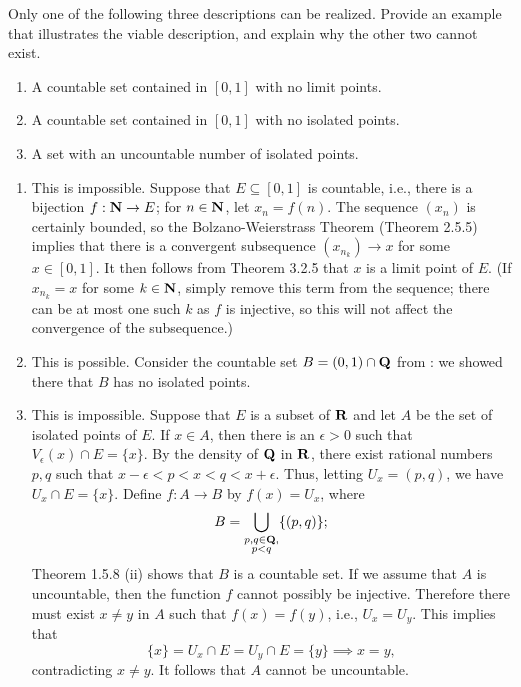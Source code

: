 \documentclass{lew98_solutions}
\begin{document}
\begin{exercise}
\label{ex:3.2.10}
    Only one of the following three descriptions can be realized. Provide an example that illustrates the viable description, and explain why the other two cannot exist.
    \begin{enumerate}
        \item A countable set contained in \( [0, 1] \) with no limit points.

        \item A countable set contained in \( [0, 1] \) with no isolated points.

        \item A set with an uncountable number of isolated points.
    \end{enumerate}
\end{exercise}

\begin{solution}
    \begin{enumerate}
        \item This is impossible. Suppose that \( E \subseteq [0, 1] \) is countable, i.e., there is a bijection \( f : \mathbf{N} \to E \); for \( n \in \mathbf{N} \), let \( x_n = f(n) \). The sequence \( (x_n) \) is certainly bounded, so the Bolzano-Weierstrass Theorem (Theorem 2.5.5) implies that there is a convergent subsequence \( (x_{n_k}) \to x \) for some \( x \in [0, 1] \). It then follows from Theorem 3.2.5 that \( x \) is a limit point of \( E \). (If \( x_{n_k} = x \) for some \( k \in \mathbf{N} \), simply remove this term from the sequence; there can be at most one such \( k \) as \( f \) is injective, so this will not affect the convergence of the subsequence.)

        \item This is possible. Consider the countable set \( B = (0, 1) \cap \mathbf{Q} \) from : we showed there that \( B \) has no isolated points.

        \item This is impossible. Suppose that \( E \) is a subset of \( \mathbf{R} \) and let \( A \) be the set of isolated points of \( E \). If \( x \in A \), then there is an \( \epsilon > 0 \) such that \( V_{\epsilon}(x) \cap E = \{ x \} \). By the density of \( \mathbf{Q} \) in \( \mathbf{R} \), there exist rational numbers \( p, q \) such that \( x - \epsilon < p < x < q < x + \epsilon \). Thus, letting \( U_x = (p, q) \), we have \( U_x \cap E = \{ x \} \). Define \( f : A \to B \) by \( f(x) = U_x \), where
        \[
            B = \bigcup_{\substack{p, q \in \mathbf{Q}, \\ p < q}} \{ (p, q) \};
        \]
        Theorem 1.5.8 (ii) shows that \( B \) is a countable set. If we assume that \( A \) is uncountable, then the function \( f \) cannot possibly be injective. Therefore there must exist \( x \neq y \) in \( A \) such that \( f(x) = f(y) \), i.e., \( U_x = U_y \). This implies that
        \[
            \{ x \} = U_x \cap E = U_y \cap E = \{ y \} \implies x = y,
        \]
        contradicting \( x \neq y \). It follows that \( A \) cannot be uncountable.
    \end{enumerate}
\end{solution}
\end{document}
